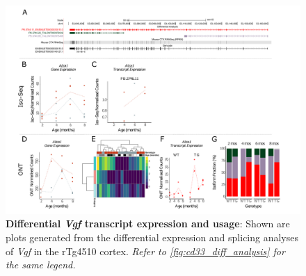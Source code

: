 \begin{landscape}
	\begin{figure}[htp]
		\begin{center}
			\includegraphics[page=20,trim={0 0.5cm 0 1.5cm},scale =0.85]{Figures/TargetGene_DifferentialAnalysis.pdf}
		\end{center}
		\captionsetup{width=1.5\textwidth}
		\caption[Differential \textit{Vgf} transcript expression and usage]%
		{\textbf{Differential \textit{Vgf} transcript expression and usage}: Shown are plots generated from the differential expression and splicing analyses of \textit{Vgf} in the rTg4510 cortex. \textit{Refer to \cref{fig:cd33_diff_analysis} for the same legend.}}   
		\label{fig:Vgf_diff_analysis}
	\end{figure}
\end{landscape}